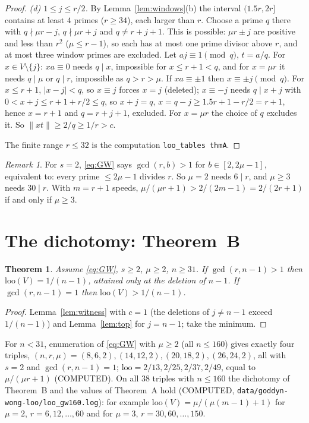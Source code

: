 \documentclass[11pt]{article}
\newtheorem{thm}{Theorem}
\theoremstyle{remark}
\newtheorem{remark}[lemma]{Remark}
\newcommand{\norm}[1]{\lVert #1\rVert}
\newcommand{\loo}{\mathrm{loo}}
\begin{document}
\begin{proof}
\emph{(d) $1\le j\le r/2$.} By Lemma~\ref{lem:windows}(b) the interval $(1.5r,2r]$ contains at least $4$ primes ($r\ge34$), each larger than $r$. Choose a prime $q$ there with $q\nmid\mu r-j$, $q\nmid\mu r+j$ and $q\ne r+j+1$. This is possible: $\mu r\pm j$ are positive and less than $r^2$ ($\mu\le r-1$), so each has at most one prime divisor above $r$, and at most three window primes are excluded. Let $aj\equiv1\pmod q$, $t=a/q$. For $x\in V\setminus\{j\}$: $xa\equiv0$ needs $q\mid x$, impossible for $x\le r+1<q$, and for $x=\mu r$ it needs $q\mid\mu$ or $q\mid r$, impossible as $q>r>\mu$. If $xa\equiv\pm1$ then $x\equiv\pm j\pmod q$. For $x\le r+1$, $|x-j|<q$, so $x\equiv j$ forces $x=j$ (deleted); $x\equiv-j$ needs $q\mid x+j$ with $0<x+j\le r+1+r/2\le q$, so $x+j=q$, $x=q-j\ge1.5r+1-r/2=r+1$, hence $x=r+1$ and $q=r+j+1$, excluded. For $x=\mu r$ the choice of $q$ excludes it. So $\norm{xt}\ge2/q\ge1/r>c$.

The finite range $r\le32$ is the computation \texttt{loo\_tables thmA}.
\end{proof}

\begin{remark}
For $s=2$, \eqref{eq:GW} says $\gcd(r,b)>1$ for $b\in[2,2\mu-1]$, equivalent to: every prime $\le2\mu-1$ divides $r$. So $\mu=2$ needs $6\mid r$, and $\mu\ge3$ needs $30\mid r$. With $m=r+1$ speeds, $\mu/(\mu r+1)>2/(2m-1)=2/(2r+1)$ if and only if $\mu\ge3$.
\end{remark}

\section{\texorpdfstring{The dichotomy: Theorem~B}{The dichotomy: Theorem B}}\label{sec:B}

\begin{thm}\label{thm:B}
Assume \eqref{eq:GW}, $s\ge2$, $\mu\ge2$, $n\ge31$. If $\gcd(r,n-1)>1$ then $\loo(V)=1/(n-1)$, attained only at the deletion of $n-1$. If $\gcd(r,n-1)=1$ then $\loo(V)>1/(n-1)$.
\end{thm}
\begin{proof}
Lemma~\ref{lem:witness} with $c=1$ (the deletions of $j\ne n-1$ exceed $1/(n-1)$) and Lemma~\ref{lem:top} for $j=n-1$; take the minimum.
\end{proof}

For $n<31$, enumeration of \eqref{eq:GW} with $\mu\ge2$ (all $n\le160$) gives exactly four triples, $(n,r,\mu)=(8,6,2),(14,12,2),(20,18,2),(26,24,2)$, all with $s=2$ and $\gcd(r,n-1)=1$; $\loo=2/13,2/25,2/37,2/49$, equal to $\mu/(\mu r+1)$ (COMPUTED). On all $38$ triples with $n\le160$ the dichotomy of Theorem~B and the values of Theorem~A hold (COMPUTED, \texttt{data/goddyn-wong-loo/loo\_gw160.log}): for example $\loo(V)=\mu/(\mu(m-1)+1)$ for $\mu=2$, $r=6,12,\dots,60$ and for $\mu=3$, $r=30,60,\dots,150$.
\end{document}
